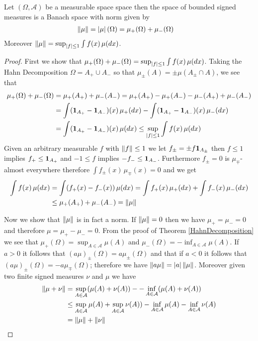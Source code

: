 \begin{thm}\label{BanachSpaceBoundedSignedMeasures}Let $(\Omega, \mathcal{A})$ be a measurable space space then the space
  of bounded signed measures is a Banach space with norm given by
\begin{align*}
\left \lVert \mu \right \rVert &= \left \vert \mu \right \vert(\Omega) = \mu_+(\Omega) + \mu_-(\Omega)
\end{align*}  
Moreover $\left \lVert \mu \right \rVert = \sup_{\left \vert f \right \vert \leq 1} \int f (x) \, \mu(dx)$.
\end{thm}
\begin{proof}
First we show that $\mu_+(\Omega) + \mu_-(\Omega) = \sup_{\left \vert f \right \vert \leq 1} \int f (x) \, \mu(dx)$.  Taking the Hahn Decomposition $\Omega = A_+ \cup A_-$ so that
$\mu_\pm(A) = \pm \mu(A_\pm \cap A)$, we see that 
\begin{align*}
\mu_+(\Omega) + \mu_-(\Omega) &= \mu_+(A_+) + \mu_-(A_-) = \mu_+(A_+) - \mu_+(A_-) - \mu_-(A_+) + \mu_-(A_-) \\
&= \int (\textbf{1}_{A_+} - \textbf{1}_{A_-}) (x) \, \mu_+(dx) - \int (\textbf{1}_{A_+} - \textbf{1}_{A_-} )(x) \, \mu_-(dx) \\
&= \int (\textbf{1}_{A_+} - \textbf{1}_{A_-}) (x) \, \mu(dx) \leq \sup_{\left \vert f \right \vert \leq 1} \int f (x) \, \mu(dx)
\end{align*}
Given an arbitrary measurable $f$ with $\left \lVert f \right \rVert \leq 1$ we let $f_\pm = \pm f \textbf{1}_{A_\pm}$ then $f \leq 1$ implies $f_+ \leq \textbf{1}_{A_+}$ and
$-1 \leq f$ implies $-f_- \leq \textbf{1}_{A_-}$.  Furthermore $f_\pm=0$ is $\mu_\mp$-almost everywhere therefore $\int f_\pm(x) \, \mu_\mp(x) = 0$ and we
get
\begin{align*}
\int f(x) \, \mu(dx) &= \int (f_+(x) - f_-(x)) \, \mu(dx) = \int f_+(x) \, \mu_+(dx) + \int f_-(x) \, \mu_-(dx) \\
&\leq \mu_+(A_+) + \mu_-(A_-) = \left \lVert \mu \right \rVert
\end{align*}

Now we show that $\left \lVert \mu \right \rVert$ is in fact a norm.  If $\left \lVert \mu \right \rVert = 0$ then we have $\mu_+ = \mu_- = 0$ and therefore
$\mu = \mu_+ - \mu_- = 0$.  From the proof of
Theorem \ref{HahnDecomposition} we see that $\mu_+(\Omega) = \sup_{A \in
  \mathcal{A}} \mu(A)$ and $\mu_-(\Omega) = -\inf_{A \in
  \mathcal{A}} \mu(A)$.  If $a > 0$ it follows that
$(a \mu)_\pm(\Omega) = a \mu_{\pm}(\Omega)$ and that if $a < 0$ it follows that $(a
\mu)_\pm(\Omega) = -a \mu_{\mp}(\Omega)$; therefore we have $\left \lVert a\mu \right \rVert =
\left \vert a \right \vert \left \lVert \mu \right \rVert$.
Moreover given two finite signed measures $\nu$ and $\mu$ we have
\begin{align*}
\left \lVert \mu + \nu \right \rVert &= \sup_{A \in \mathcal{A}} (\mu(A) + \nu(A)) -
                   -\inf_{A \in \mathcal{A}} (\mu(A) + \nu(A)) \\
&\leq \sup_{A \in \mathcal{A}}\mu(A) + \sup_{A \in \mathcal{A}} \nu(A)) -\inf_{A \in \mathcal{A}} \mu(A) -\inf_{A \in \mathcal{A}} \nu(A) \\
&= \left \lVert \mu \right \rVert + \left \lVert \nu \right \rVert
\end{align*}


\end{proof}
